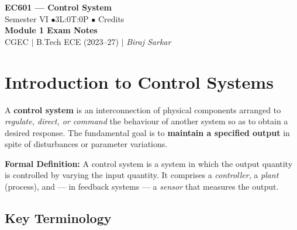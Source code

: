 \documentclass[12pt,a4paper]{article}
\begin{document}

\begin{center}
  {\LARGE\bfseries\color{myred} EC601 — Control System}\\[5pt]
  {\normalsize\color{mydark} Semester VI \quad$\bullet$\quad 3L:0T:0P \quad$\bullet$ Credits}\\[3pt]
  {\normalsize\color{myteal}\textbf{Module 1 Exam Notes}}\\[3pt]
  {\small\color{mydark} CGEC \;$|$\; B.Tech ECE (2023--27) \;$|$\; \textit{Biraj Sarkar}}
\end{center}
\vspace{2pt}
\noindent{\color{myred}\rule{\linewidth}{1.5pt}}
\vspace{2pt}

\hypersetup{linkcolor=mydark}
\tableofcontents
\hypersetup{linkcolor=myteal}
\newpage

\section{Introduction to Control Systems}

A \textbf{control system} is an interconnection of physical components arranged to \textit{regulate, direct, or command} the behaviour of another system so as to obtain a desired response. The fundamental goal is to \textbf{maintain a specified output} in spite of disturbances or parameter variations.

\begin{tcolorbox}[defbox]
\textbf{Formal Definition:} A control system is a system in which the output quantity is controlled by varying the input quantity. It comprises a \textit{controller}, a \textit{plant} (process), and — in feedback systems — a \textit{sensor} that measures the output.
\end{tcolorbox}

\subsection{Key Terminology}
\end{document}
